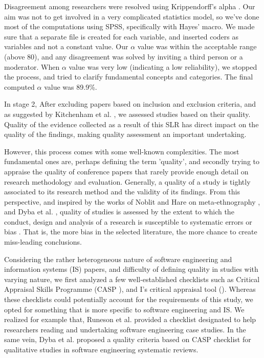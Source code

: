 \documentclass{ieeeaccess}
\begin{document}
Disagreement among researchers were resolved using Krippendorff’s alpha \cite{krippendorff2011computing}. Our aim was not to get involved in a very complicated statistics model, so we've done most of the computations using SPSS, specifically with Hayes’ macro. We made sure that a separate file is created for each variable, and inserted coders as variables and not a constant value. Our $ \alpha $ value was within the acceptable range (above 80), and any disagreement was solved by inviting a third person or a moderator. When $ \alpha $ value was very low (indicating a low reliability), we stopped the process, and tried to clarify fundamental concepts and categories. The final computed $ \alpha $ value was 89.9\%. 

In stage 2, After excluding papers based on inclusion and exclusion criteria, and as suggested by Kitchenham et al. \cite{kitchenham2015evidence}, we assessed studies based on their quality. Quality of the evidence collected as a result of this SLR has direct impact on the quality of the findings, making quality assessment an important undertaking.

However, this process comes with some well-known complexities. The most fundamental ones are, perhaps defining the term 'quality', and secondly trying to appraise the quality of conference papers that rarely provide enough detail on research methodology and evaluation. Generally, a quality of a study is tightly associated to its research method and the validity of its findings. From this perspective, and inspired by the works of Noblit and Hare on meta-ethnography \cite{noblit1988meta}, and Dyba et al. \cite{dybaa2008empirical}, quality of studies is assessed by the extent to which the conduct, design and analysis of a research is susceptible to systematic errors or bias \cite{cumpston2019updated}. That is, the more bias in the selected literature, the more chance to create miss-leading conclusions.

Considering the rather heterogeneous nature of software engineering and information systems (IS) papers, and difficulty of defining quality in studies with varying nature, we first analyzed a few well-established checklists such as Critical Appraisal Skills Programme (CASP \cite{tools2018checklists}), and  I's critical appraisal tool (\cite{JBI}). Whereas these checklists could potentially account for the requirements of this study, we opted for something that is more specific to software engineering and IS. We realized for example that, Runeson et al. \cite{runeson2006we} provided a checklist designated to help researchers reading and undertaking software engineering case studies. In the same vein, Dyba et al. \cite{dybaa2008empirical} proposed a quality criteria based on CASP checklist for qualitative studies in software engineering systematic reviews. 
\end{document}
